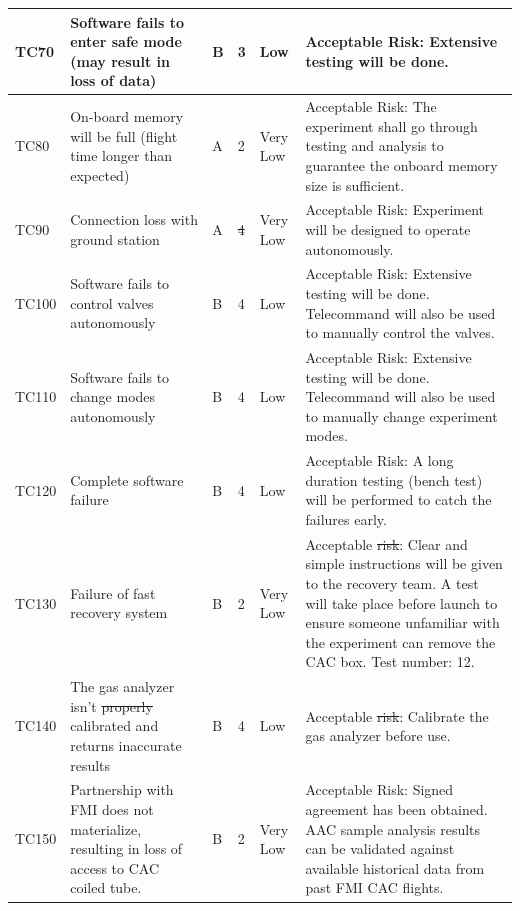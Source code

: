 \documentclass[a4paper,12pt,twoside]{article}
\providecommand{\DIFaddtex}[1]{{\protect\color{blue}\uwave{#1}}} %
\providecommand{\DIFdeltex}[1]{{\protect\color{red}\sout{#1}}}                      %
\providecommand{\DIFaddbegin}{} %
\providecommand{\DIFaddend}{} %
\providecommand{\DIFdelbegin}{} %
\providecommand{\DIFdelend}{} %
\providecommand{\DIFadd}[1]{\texorpdfstring{\DIFaddtex{#1}}{#1}} %
\providecommand{\DIFdel}[1]{\texorpdfstring{\DIFdeltex{#1}}{}} %
\newcommand{\DIFscaledelfig}{0.5}
\newlength{\DIFdelgraphicswidth} %
\newlength{\DIFdelgraphicsheight} %
\newcommand{\DIFaddincludegraphics}[2][]{{\color{blue}\fbox{\DIFOincludegraphics[#1]{#2}}}} %
\newcommand{\DIFdelincludegraphics}[2][]{%
\sbox{\DIFdelgraphicsbox}{\DIFOincludegraphics[#1]{#2}}%
\settoboxwidth{\DIFdelgraphicswidth}{\DIFdelgraphicsbox} %
\settoboxtotalheight{\DIFdelgraphicsheight}{\DIFdelgraphicsbox} %
\scalebox{\DIFscaledelfig}{%
\parbox[b]{\DIFdelgraphicswidth}{\usebox{\DIFdelgraphicsbox}\\[-\baselineskip] \rule{\DIFdelgraphicswidth}{0em}}\llap{\resizebox{\DIFdelgraphicswidth}{\DIFdelgraphicsheight}{%
\setlength{\unitlength}{\DIFdelgraphicswidth}%
\begin{picture}(1,1)%
\thicklines\linethickness{2pt} %
{\color[rgb]{1,0,0}\put(0,0){\framebox(1,1){}}}%
{\color[rgb]{1,0,0}\put(0,0){\line( 1,1){1}}}%
{\color[rgb]{1,0,0}\put(0,1){\line(1,-1){1}}}%
\end{picture}%
}\hspace*{3pt}}} %
} %
\DeclareRobustCommand{\DIFaddbegin}{\DIFOaddbegin \let\includegraphics\DIFaddincludegraphics} %
\DeclareRobustCommand{\DIFaddend}{\DIFOaddend \let\includegraphics\DIFOincludegraphics} %
\DeclareRobustCommand{\DIFdelbegin}{\DIFOdelbegin \let\includegraphics\DIFdelincludegraphics} %
\DeclareRobustCommand{\DIFdelend}{\DIFOaddend \let\includegraphics\DIFOincludegraphics} %
\begin{document}
\begin{landscape}
\begin{longtable}{|m{}| m{} |m{} |m{}|m{}| m{}|}
TC70 & Software fails to enter safe mode (may result in loss of data) & B & 3 & \cellcolor[HTML]{FCFF2F}Low & Acceptable Risk: Extensive testing will be done. \\ \hline
TC80 & On-board memory will be full (flight time longer than expected) & A & 2 & \cellcolor[HTML]{34FF34}Very Low & Acceptable Risk: The experiment shall go through testing and analysis to guarantee the onboard memory size is sufficient.\\ \hline
TC90 & Connection loss with ground station & A & \DIFdelbegin \DIFdel{4 }\DIFdelend \DIFaddbegin \DIFadd{2 }\DIFaddend & \cellcolor[HTML]{34FF34}Very Low & Acceptable Risk: Experiment will be designed to operate autonomously. \\ \hline
TC100 & Software fails to control valves autonomously & B & 4 & \cellcolor[HTML]{FCFF2F}Low & Acceptable Risk: Extensive testing will be done. Telecommand will also be used to manually control the valves. \\ \hline
TC110 & Software fails to change modes autonomously & B & 4 & \cellcolor[HTML]{FCFF2F}Low & Acceptable Risk: Extensive testing will be done. Telecommand will also be used to manually change experiment modes. \\ \hline
TC120 & Complete software failure & B & 4 & \cellcolor[HTML]{FCFF2F}Low & Acceptable Risk: A long duration testing (bench test) will be performed to catch the failures early. \\ \hline
TC130 & Failure of fast recovery system & B & 2 & \cellcolor[HTML]{34FF34}Very Low & Acceptable \DIFdelbegin \DIFdel{risk}\DIFdelend \DIFaddbegin \DIFadd{Risk}\DIFaddend : Clear and simple instructions will be given to the recovery team. A test will take place before launch to ensure someone unfamiliar with the experiment can remove the CAC box. Test number: 12. \\ \hline
TC140 & The gas analyzer isn't \DIFdelbegin \DIFdel{properly }\DIFdelend \DIFaddbegin \DIFadd{correctly }\DIFaddend calibrated and returns inaccurate results & B & 4 & \cellcolor[HTML]{FCFF2F}Low & Acceptable \DIFdelbegin \DIFdel{risk}\DIFdelend \DIFaddbegin \DIFadd{Risk}\DIFaddend : Calibrate the gas analyzer before use.\\ \hline 
TC150 & Partnership with FMI does not materialize, resulting in loss of access to CAC coiled tube. & B & 2 & \cellcolor[HTML]{34FF34}Very Low & Acceptable Risk: Signed agreement has been obtained. AAC sample analysis results can be validated against available historical data from past FMI CAC flights. \\ \hline 

\end{longtable}
\end{landscape}
\end{document}

